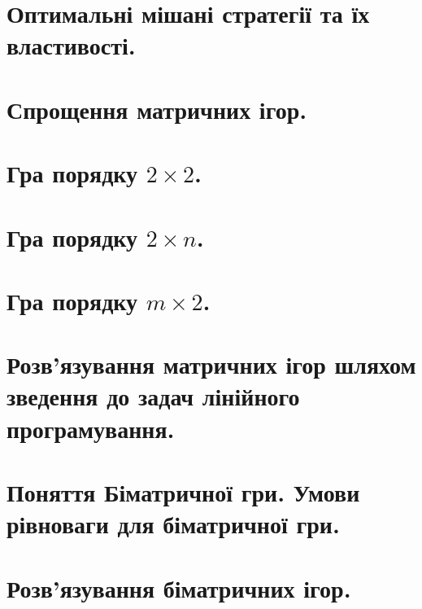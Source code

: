 \documentclass[12pt,a4paper]{article}
\begin{document}
\clearpage

\section{Оптимальні мішані стратегії та їх властивості.}

\clearpage

\section{Спрощення матричних ігор.}

\clearpage

\section{Гра порядку $2 \times 2$.}

\clearpage

\section{Гра порядку $2 \times n$.}

\clearpage

\section{Гра порядку $m \times 2$.}

\clearpage

\section{Розв'язування матричних ігор шляхом зведення до задач лінійного програмування.}

\clearpage

\section{Поняття Біматричної гри. Умови рівноваги для біматричної гри.}

\clearpage

\section{Розв'язування біматричних ігор.}
\end{document}
